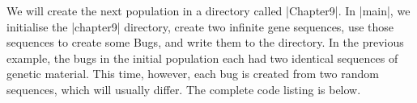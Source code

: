 We will create the next population in a directory called |Chapter9|.
In |main|, we initialise the |chapter9| directory, 
create two infinite gene sequences,
use those sequences to create some Bugs,
and write them to the directory.
In the previous example, the bugs in the initial population each had two identical
sequences of genetic material.
This time, however, each bug is created from two random sequences, which will usually differ.
The complete code listing is below.



